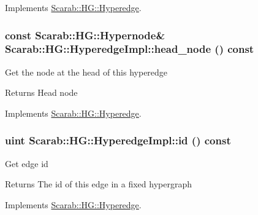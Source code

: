 Implements \hyperlink{class_scarab_1_1_h_g_1_1_hyperedge_a0d201ddb955631aadee4c15cc8e709f8}{Scarab::HG::Hyperedge}.

\hypertarget{class_scarab_1_1_h_g_1_1_hyperedge_impl_ae194bfc8ecac2a12791fa36c1c2c62a7}{
\subsubsection[{head\_\-node}]{\setlength{\rightskip}{0pt plus 5cm}const {\bf Scarab::HG::Hypernode}\& Scarab::HG::HyperedgeImpl::head\_\-node () const}}
\label{class_scarab_1_1_h_g_1_1_hyperedge_impl_ae194bfc8ecac2a12791fa36c1c2c62a7}
Get the node at the head of this hyperedge

\begin{DoxyReturn}{Returns}
Head node 
\end{DoxyReturn}


Implements \hyperlink{class_scarab_1_1_h_g_1_1_hyperedge_a6043de341070c103d811f5286193dd46}{Scarab::HG::Hyperedge}.

\hypertarget{class_scarab_1_1_h_g_1_1_hyperedge_impl_afa81943347267781c25c4e68f7f5f547}{
\subsubsection[{id}]{\setlength{\rightskip}{0pt plus 5cm}uint Scarab::HG::HyperedgeImpl::id () const}}
\label{class_scarab_1_1_h_g_1_1_hyperedge_impl_afa81943347267781c25c4e68f7f5f547}
Get edge id

\begin{DoxyReturn}{Returns}
The id of this edge in a fixed hypergraph 
\end{DoxyReturn}


Implements \hyperlink{class_scarab_1_1_h_g_1_1_hyperedge_af824beb7107253a7545b35992c17e057}{Scarab::HG::Hyperedge}.

